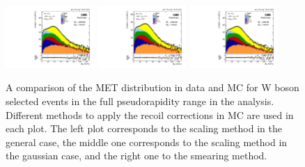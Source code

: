 \begin{figure}[!h]
 \begin{center}
  \includegraphics[width=0.3\textwidth]{Figures/WBoson/Analysis/Correction/Recoil/CheckFits/W/Recoil_ScalingGeneral/PLOT_MET_DATA_WToMuMi_PA_Model_TEMP_WDYDYToTauWToTauTTbar_ModifiedRayleigh_QCD_MuEtaCM_m286_193_MuIso_0_15.pdf}
  \includegraphics[width=0.3\textwidth]{Figures/WBoson/Analysis/Correction/Recoil/CheckFits/W/Recoil_ScalingGauss/PLOT_MET_DATA_WToMuMi_PA_Model_TEMP_WDYDYToTauWToTauTTbar_ModifiedRayleigh_QCD_MuEtaCM_m286_193_MuIso_0_15.pdf}
  \includegraphics[width=0.3\textwidth]{Figures/WBoson/Analysis/Correction/Recoil/CheckFits/W/Recoil_Smearing/PLOT_MET_DATA_WToMuMi_PA_Model_TEMP_WDYDYToTauWToTauTTbar_ModifiedRayleigh_QCD_MuEtaCM_m286_193_MuIso_0_15.pdf}
  \caption{A comparison of the MET distribution in data and MC for W boson selected events in the full pseudorapidity range in the analysis. Different methods to apply the recoil corrections in MC are used in each plot. The left plot corresponds to the scaling method in the general case, the middle one corresponds to the scaling method in the gaussian case, and the right one to the smearing method.}
 \end{center}
 \label{fig:recoilCorrWreg}
\end{figure}


